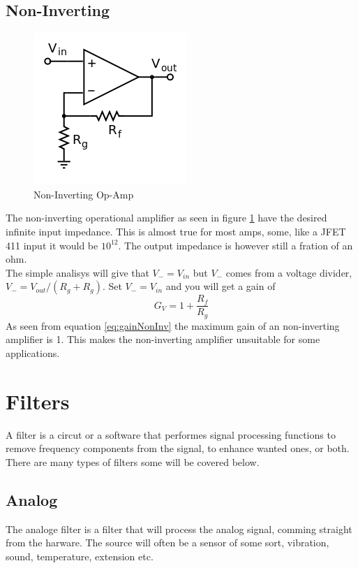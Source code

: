 \documentclass[12pt,a4paper]{article}
\begin{document}
    \subsection{Non-Inverting}
    \begin{figure}[!h]
      \begin{center}
        \includegraphics[scale=0.5]{NonInvOpAmp}
        \caption{Non-Inverting Op-Amp}
        \label{fig:NonInvOpAmp}
      \end{center}
    \end{figure}
    The non-inverting operational amplifier as seen in figure 
    \ref{fig:NonInvOpAmp} have the desired infinite input impedance.
    This is almost true for most amps, some, like a JFET 411 input it
    would be $10^12$. The output impedance is however still a fration of
    an ohm.\\
    The simple analisys will give that $V_- = V_{in}$ but $V_-$
    comes from a voltage divider, $V_-=V_{out}/(R_g+R_g)$. Set
    $V_-=V_{in}$ and you will get a gain of
    \begin{equation}
        G_V=1+\frac{R_f}{R_g}
        \label{eq:gainNonInv}
    \end{equation}
    As seen from equation \ref{eq:gainNonInv} the maximum gain of an
    non-inverting amplifier is 1. This makes the non-inverting amplifier
    unsuitable for some applications. 





    \section{Filters}
  A filter is a circut or a software that performes signal processing
  functions to remove frequency components from the signal, to enhance
  wanted ones, or both. There are many types of filters some will be
  covered below.
  \subsection{Analog}
  The analoge filter is a filter that will process the analog signal,
  comming straight from the harware. The source will often be a sensor
  of some sort, vibration, sound, temperature, extension etc. 
\end{document}
